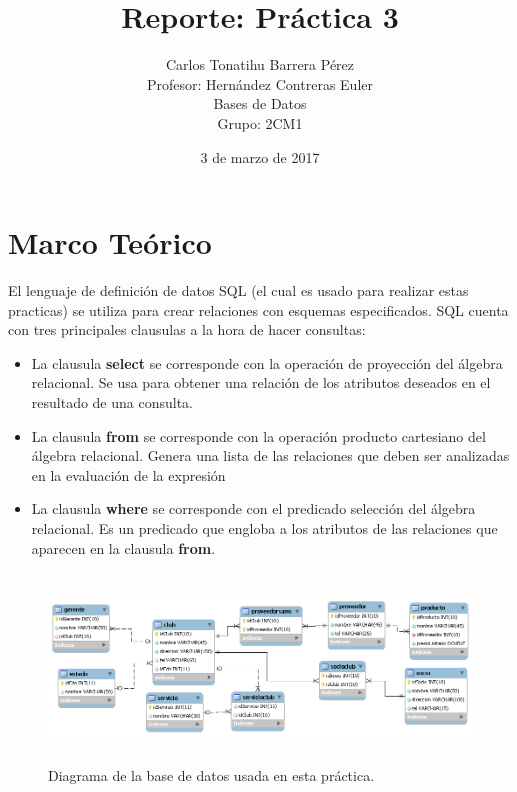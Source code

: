 \documentclass[12pt, titlepage]{article}
\title{Reporte: Práctica 3}
\author{Carlos Tonatihu Barrera Pérez \\ Profesor: Hernández Contreras Euler \\ Bases de Datos \\ Grupo: 2CM1 }
\date{3 de marzo de 2017}
\begin{document}
    \maketitle
    \tableofcontents
    \section{Marco Teórico}
    El lenguaje de definición de datos SQL (el cual es usado para realizar estas practicas) se utiliza para crear relaciones con esquemas especificados.\cite{LIBRO}
    SQL cuenta con tres principales clausulas a la hora de hacer consultas:
    \begin{itemize}
    \item La clausula \textbf{select} se corresponde con la operación de proyección del álgebra relacional. Se usa para obtener una relación de los atributos deseados en el resultado de una consulta.
    \item La clausula \textbf{from} se corresponde con la operación producto cartesiano del álgebra relacional. Genera una lista de las relaciones que deben ser analizadas en la evaluación de la expresión
    \item La clausula \textbf{where} se corresponde con el predicado selección del álgebra relacional. Es un predicado que engloba a los atributos de las relaciones que aparecen en la clausula \textbf{from}.
    \end{itemize}
    \begin{figure}[H]
        \begin{center}
            \includegraphics[width=16cm, height=5cm]{img/sams.png}
            \caption{Diagrama de la base de datos usada en esta práctica.}
            \label{fig:hasta-usf}
        \end{center}
    \end{figure}
    \newpage
\end{document}
